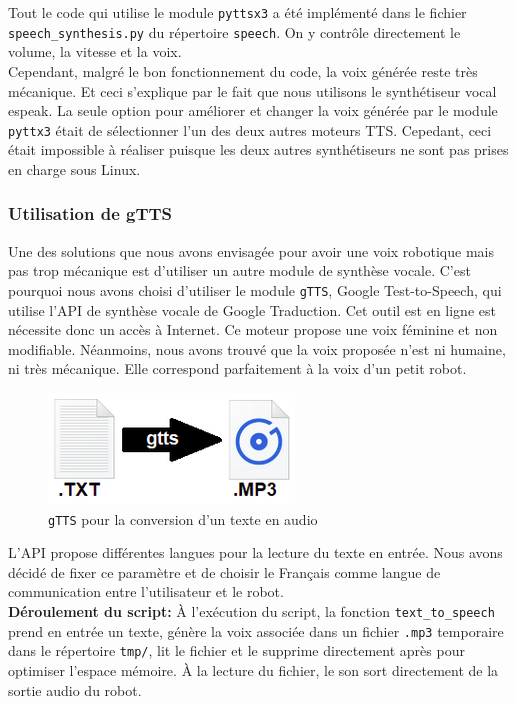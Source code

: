 \documentclass[a4paper,french]{article}
\begin{document}
Tout le code qui utilise le module \texttt{pyttsx3} a été implémenté dans le fichier \texttt{speech\_synthesis.py} du répertoire \texttt{speech}. On y contrôle directement le volume, la vitesse et la voix.\\
Cependant, malgré le bon fonctionnement du code, la voix générée reste très mécanique. Et ceci s'explique par le fait que nous utilisons le synthétiseur vocal espeak. La seule option pour améliorer et changer la voix générée par le module \texttt{pyttx3} était de sélectionner l'un des deux autres moteurs TTS. Cepedant, ceci était impossible à réaliser puisque les deux autres synthétiseurs ne sont pas prises en charge sous Linux.

\subsubsection{Utilisation de gTTS}
Une des solutions que nous avons envisagée pour avoir une voix robotique mais pas trop mécanique est d'utiliser un autre module de synthèse vocale. C'est pourquoi nous avons choisi d'utiliser le module \texttt{gTTS}, Google Test-to-Speech, qui utilise l'API de synthèse vocale de Google Traduction. Cet outil est en ligne est nécessite donc un accès à Internet. Ce moteur propose une voix féminine et non modifiable. Néanmoins, nous avons trouvé que la voix proposée n'est ni humaine, ni très mécanique. Elle correspond parfaitement à la voix d'un petit robot.\\

\begin{figure}[H]
    \centering
    \includegraphics[scale=0.8]{figures/gtts.png}
    \caption{\texttt{gTTS} pour la conversion d'un texte en audio}
    \label{fig:gTTS}
\end{figure}

L'API propose différentes langues pour la lecture du texte en entrée. Nous avons décidé de fixer ce paramètre et de choisir le Français comme langue de communication entre l'utilisateur et le robot.\\

\textbf{Déroulement du script:} 
À l'exécution du script, la fonction \texttt{text\_to\_speech} prend en entrée un texte, génère la voix associée dans un fichier \texttt{.mp3} temporaire dans le répertoire \texttt{tmp/}, lit le fichier et le supprime directement après pour optimiser l'espace mémoire. À la lecture du fichier, le son sort directement de la sortie audio du robot.\\
\end{document}

